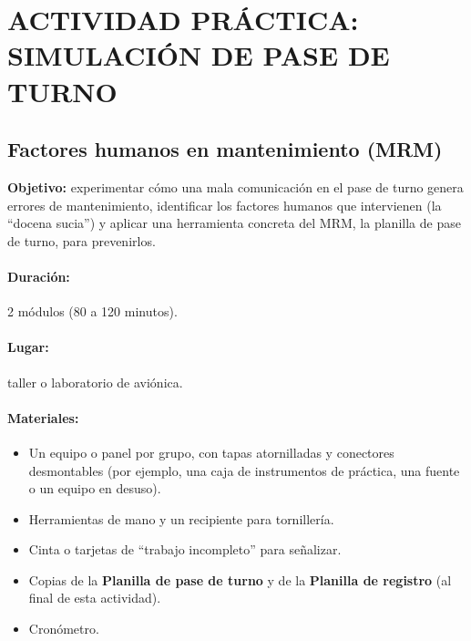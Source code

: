 \clearpage
\section*{ACTIVIDAD PRÁCTICA: SIMULACIÓN DE PASE DE TURNO}
\subsection*{Factores humanos en mantenimiento (MRM)}

\begin{recuadro}
\textbf{Objetivo:} experimentar cómo una mala comunicación en el pase de turno genera errores
de mantenimiento, identificar los factores humanos que intervienen (la ``docena sucia'') y
aplicar una herramienta concreta del MRM, la planilla de pase de turno, para prevenirlos.
\end{recuadro}

\paragraph*{Duración:} 2 módulos (80 a 120 minutos).
\paragraph*{Lugar:} taller o laboratorio de aviónica.
\paragraph*{Materiales:}
\begin{itemize}
  \item Un equipo o panel por grupo, con tapas atornilladas y conectores desmontables
        (por ejemplo, una caja de instrumentos de práctica, una fuente o un equipo en desuso).
  \item Herramientas de mano y un recipiente para tornillería.
  \item Cinta o tarjetas de ``trabajo incompleto'' para señalizar.
  \item Copias de la \textbf{Planilla de pase de turno} y de la \textbf{Planilla de registro}
        (al final de esta actividad).
  \item Cronómetro.
\end{itemize}

